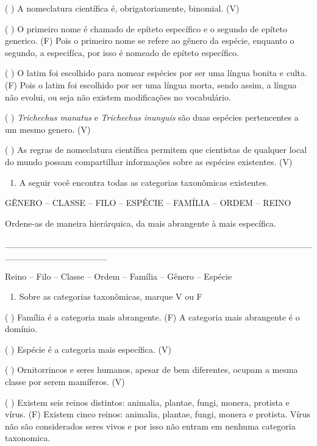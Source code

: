 ( ) A nomeclatura científica é, obrigatoriamente, binomial. (V)

( ) O primeiro nome é chamado de epíteto específico e o segundo de
epíteto generico. (F) Pois o primeiro nome se refere ao gênero da
espécie, enquanto o segundo, a especifíca, por isso é nomeado de epíteto
específico.

( ) O latim foi escolhido para nomear espécies por ser uma língua bonita
e culta. (F) Pois o latim foi escolhido por ser uma língua morta, sendo
assim, a língua não evolui, ou seja não existem modificações no
vocabulário.

( ) \emph{Trichechus manatus} e \emph{Trichechus inunguis} são duas
espécies pertencentes a um mesmo genero. (V)

( ) As regras de nomeclatura científica permitem que cientistas de
qualquer local do mundo possam compartilhar informações sobre as
espécies existentes. (V)

\begin{enumerate}
\def\labelenumi{\arabic{enumi}.}
\item
  A seguir você encontra todas as categorias taxonômicas existentes.
\end{enumerate}

GÊNERO -- CLASSE -- FILO -- ESPÉCIE -- FAMÍLIA -- ORDEM -- REINO

Ordene-as de maneira hierárquica, da mais abrangente à mais específica.

\_\_\_\_\_\_\_\_\_\_\_\_\_\_\_\_\_\_\_\_\_\_\_\_\_\_\_\_\_\_\_\_\_\_\_\_\_\_\_\_\_\_\_\_\_\_\_\_\_\_\_\_\_\_\_\_\_\_\_\_\_\_\_\_

Reino -- Filo -- Classe -- Ordem -- Família -- Gênero -- Espécie

\begin{enumerate}
\def\labelenumi{\arabic{enumi}.}
\item
  Sobre as categorias taxonômicas, marque V ou F
\end{enumerate}

( ) Família é a categoria mais abrangente. (F) A categoria mais
abrangente é o domínio.

( ) Espécie é a categoria mais específica. (V)

( ) Ornitorrincos e seres humanos, apesar de bem diferentes, ocupam a
mesma classe por serem mamíferos. (V)

( ) Existem seis reinos distintos: animalia, plantae, fungi, monera,
protista e vírus. (F) Existem cinco reinos: animalia, plantae, fungi,
monera e protista. Vírus não são considerados seres vivos e por isso não
entram em nenhuma categoria taxonomica.

